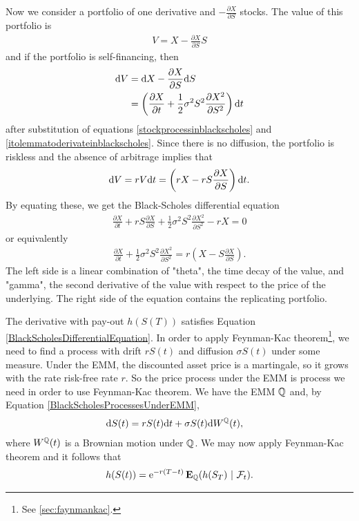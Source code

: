 Now we consider a portfolio of one derivative and $-\frac{\partial X}{\partial S}$ stocks. The value of this portfolio is
  \begin{align}
    V = X - \frac{\partial X}{\partial S} S
  \end{align}
and if the portfolio is self-financing, then
  \begin{align}
    \mathrm{d} V &= \mathrm{d} X - \frac{\partial X}{\partial S} \mathrm{d} S \\
      &= \left( \frac{\partial X}{\partial t} + \frac{1}{2} \sigma^2 S^2 \frac{\partial X^2}{\partial S^2} \right) \mathrm{d} t
  \end{align}
after substitution of equations \ref{stockprocessinblackscholes} and \ref{itolemmatoderivateinblackscholes}. Since there is no diffusion, the portfolio is riskless and the absence of arbitrage implies that 
  \begin{align}
    \mathrm{d} V = rV \mathrm{d} t = \left( rX - r S\frac{\partial X}{\partial S} \right) \mathrm{d} t .
  \end{align}
By equating these, we get the Black-Scholes differential equation
  \begin{align}
  	\label{BlackScholesDifferentialEquation}
    \frac{\partial X}{\partial t} + r S\frac{\partial X}{\partial S} + \frac{1}{2} \sigma^2 S^2 \frac{\partial X^2}{\partial S^2} - r X = 0
  \end{align}
or equivalently
 	\begin{align}
		\frac{\partial X}{\partial t} + \frac{1}{2} \sigma^2 S^2 \frac{\partial X^2}{\partial S^2} = r ( X - S\frac{\partial X}{\partial S}) .
	\end{align}
The left side is a linear combination of "theta", the time decay of the value, and "gamma", the second derivative of the value with respect to the price of the underlying. The right side of the equation contains the replicating portfolio.

The derivative with pay-out $h(S(T))$ satisfies Equation \ref{BlackScholesDifferentialEquation}. In order to apply Feynman-Kac theorem\footnote{See \ref{sec:faynmankac}.}, we need to find a process with drift $rS(t)$ and diffusion $\sigma S(t)$ under some measure. Under the EMM, the discounted asset price is a martingale, so it grows with the rate risk-free rate $r$. So the price process under the EMM is process we need in order to use Feynman-Kac theorem. We have the EMM $\mathbb{Q}$ and, by Equation \ref{BlackScholesProcessesUnderEMM},
	\begin{align}
		\mathrm{d} S(t) &= r S(t) \mathrm{d} t + \sigma S(t) \mathrm{d} W^{\mathbb{Q}}(t) ,		
	\end{align}
where $W^{\mathbb{Q}}(t)$ is a Brownian motion under $\mathbb{Q}$. We may now apply Feynman-Kac theorem and it follows that
	\begin{align}
		h(S(t)) = \mathrm{e}^{ -r(T-t) } \operatorname{\boldsymbol{\mathrm{E}}}_{\mathbb{Q}} ( h(S_T) \ | \ \mathcal{F}_t) .
	\end{align}
	

